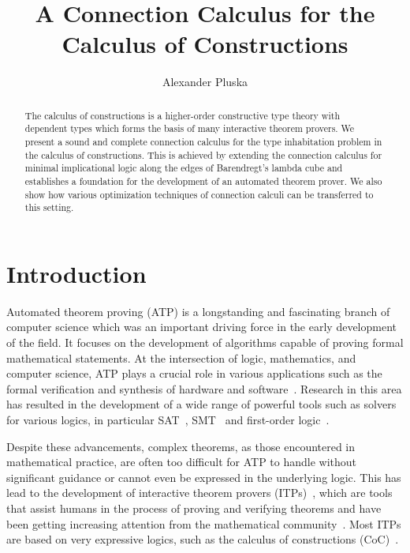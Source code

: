 \documentclass[11pt]{article}
\title{A Connection Calculus for the Calculus of Constructions}
\author{Alexander Pluska}
\theoremstyle{definition}
\theoremstyle{definition}
\theoremstyle{definition}
\theoremstyle{definition}
\theoremstyle{definition}
\theoremstyle{definition}
\theoremstyle{definition}
\begin{document}
    \maketitle

	\begin{abstract}
		The calculus of constructions is a higher-order constructive type theory with dependent types which forms the basis of many interactive theorem provers. We present a sound and complete connection calculus for the type inhabitation problem in the calculus of constructions. This is achieved by extending the connection calculus for minimal implicational logic along the edges of Barendregt's lambda cube and establishes a foundation for the development of an automated theorem prover. We also show how various optimization techniques of connection calculi can be transferred to this setting.
	\end{abstract}
	
	\section{Introduction}

	Automated theorem proving (ATP) is a longstanding and fascinating branch of computer science which was an important driving force in the early development of the field. It focuses on the development of algorithms capable of proving formal mathematical statements.	
	At the intersection of logic, mathematics, and computer science, ATP plays a crucial role in various applications such as the formal verification and synthesis of hardware and software~\cite{hunt2017industrial,woodcock2009formal,hasan2015formal,aagaard1993verifying,ranise2003applying}. Research in this area has resulted in the development of a wide range of powerful tools such as solvers for various logics, in particular SAT~\cite{balyo2022sat}, SMT~\cite{weber2019smt} and first-order logic~\cite{Sut16}.

	Despite these advancements, complex theorems, as those encountered in mathematical practice, are often too difficult for ATP to handle without significant guidance or cannot even be expressed in the underlying logic. This has lead to the development of interactive theorem provers (ITPs)~\cite{blanchette2011automatic,bertot2013interactive,moura2021lean}, which are tools that assist humans in the process of proving and verifying theorems and have been getting increasing attention from the mathematical community~\cite{hales2017formal,buzzard2020formalising,dahmen2019formalizing,gouezel2019corrected,tao2023}. Most ITPs are based on very expressive logics, such as the calculus of constructions (CoC)~\cite{paulin2015introduction}.
\end{document}

